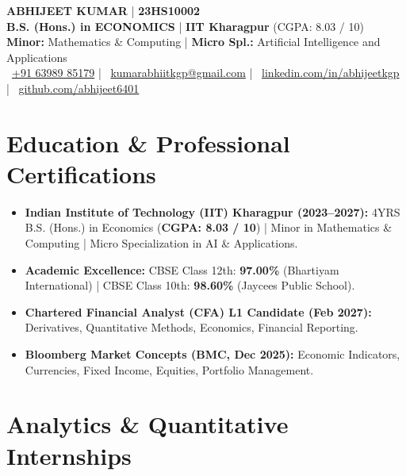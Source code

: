 \documentclass[10pt, a4paper]{article}
\begin{document}
\begin{center}
  {\LARGE \textbf{ABHIJEET KUMAR}} \quad | \quad \textbf{23HS10002} \\[3pt]
  \textbf{B.S. (Hons.) in ECONOMICS} \quad | \quad \textbf{IIT Kharagpur} (CGPA: 8.03 / 10) \\[2pt]
  \small \textbf{Minor:} Mathematics \& Computing \quad | \quad \textbf{Micro Spl.:} Artificial Intelligence and Applications \\[3pt]
  \small
  \faPhone\ \href{tel:+916398985179}{+91 63989 85179} \quad | \quad
  \faEnvelope\ \href{mailto:kumarabhiitkgp@gmail.com}{kumarabhiitkgp@gmail.com} \quad | \quad
  \faLinkedin\ \href{https://linkedin.com/in/abhijeetkgp}{linkedin.com/in/abhijeetkgp} \quad | \quad
  \faGithub\ \href{https://github.com/abhijeet6401}{github.com/abhijeet6401}
\end{center}

\vspace{-4pt}

\section{Education \& Professional Certifications}
\begin{itemize}[leftmargin=1.2em, itemsep=0.5pt, parsep=0pt, topsep=1pt]
  \small
  \item \textbf{Indian Institute of Technology (IIT) Kharagpur (2023--2027):} 4YRS B.S. (Hons.) in Economics (\textbf{CGPA: 8.03 / 10}) | Minor in Mathematics \& Computing | Micro Specialization in AI \& Applications.
  \item \textbf{Academic Excellence:} CBSE Class 12th: \textbf{97.00\%} (Bhartiyam International) | CBSE Class 10th: \textbf{98.60\%} (Jaycees Public School).
  \item \textbf{Chartered Financial Analyst (CFA) L1 Candidate (Feb 2027):} Derivatives, Quantitative Methods, Economics, Financial Reporting.
  \item \textbf{Bloomberg Market Concepts (BMC, Dec 2025):} Economic Indicators, Currencies, Fixed Income, Equities, Portfolio Management.
\end{itemize}

\vspace{-2pt}

\section{Analytics \& Quantitative Internships}
\end{document}
